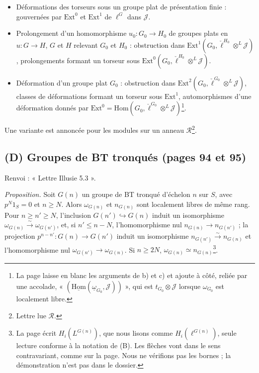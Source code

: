 \documentclass[11pt,a4paper]{article}
\begin{document}
\begin{itemize}
  \item[(0)] Déformations des torseurs sous un groupe plat de présentation
  finie : gouvernées par $\mathrm{Ext}^{0}$ et $\mathrm{Ext}^{1}$ de
  $\ell^{G}$ dans $\mathcal{J}$.
  \item[(1)] Prolongement d'un homomorphisme $u_0 \colon G_0 \to H_0$ de
  groupes plats en $u \colon G \to H$, $G$ et $H$ relevant $G_0$ et $H_0$
  : obstruction dans $\mathrm{Ext}^{1}(G_0, \check{\ell}^{H_0}
  \otimes^{L} \mathcal{J})$, prolongements formant un torseur sous
  $\mathrm{Ext}^{0}(G_0, \check{\ell}^{H_0} \otimes^{L} \mathcal{J})$.
  \item[(2)] Déformation d'un groupe plat $G_0$ : obstruction dans
  $\mathrm{Ext}^{2}(G_0, \check{\ell}^{G_0} \otimes^{L} \mathcal{J})$,
  classes de déformations formant un torseur sous $\mathrm{Ext}^{1}$,
  automorphismes d'une déformation donnés par $\mathrm{Ext}^{0} =
  \mathrm{Hom}(G_0, \check{\ell}^{G_0} \otimes^{L} \mathcal{J})$\footnote{La
  page laisse en blanc les arguments de b) et c) et ajoute à côté,
  reliée par une accolade, « $(\underline{\mathrm{Hom}}(\underline{\omega}_{G_0},
  \mathcal{J}))$ », qui est $t_{G_0} \otimes \mathcal{J}$ lorsque
  $\omega_{G_0}$ est localement libre.}.
\end{itemize}
Une variante est annoncée pour les modules sur un anneau
$\mathcal{R}$\footnote{Lettre lue $\mathcal{R}$.}.

\subsection*{(D) Groupes de BT tronqués (pages 94 et 95)}

Renvoi : « Lettre Illusie 5.3 ».

\emph{Proposition.} Soit $G(n)$ un groupe de BT tronqué d'échelon $n$ sur
$S$, avec $p^{N} 1_S = 0$ et $n \geq N$. Alors $\omega_{G(n)}$ et
$n_{G(n)}$ sont localement libres de même rang. Pour $n \geq n' \geq N$,
l'inclusion $G(n') \hookrightarrow G(n)$ induit un isomorphisme
$\omega_{G(n)} \xrightarrow{\sim} \omega_{G(n')}$, et, si $n' \leq n - N$,
l'homomorphisme nul $n_{G(n)} \to n_{G(n')}$ ; la projection
$p^{n-n'} \colon G(n) \to G(n')$ induit un isomorphisme $n_{G(n')}
\xrightarrow{\sim} n_{G(n)}$ et l'homomorphisme nul $\omega_{G(n')} \to
\omega_{G(n)}$. Si $n \geq 2N$, $\omega_{G(n)} \simeq
n_{G(n)}$\footnote{La page écrit $H_i(L^{G(n)})$, que nous lisons comme
$H_i(\ell^{G(n)})$, seule lecture conforme à la notation de (B). Les
flèches vont dans le sens contravariant, comme sur la page. Nous ne
vérifions pas les bornes ; la démonstration n'est pas dans le dossier.}.
\end{document}
